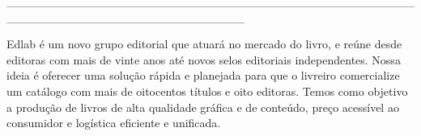 \blankpage

\pagestyle{indice}

\vspace*{.5cm}

{}

\vspace{.5cm}

{}


\hspace*{-2cm}\_\_\_\_\_\_\_\_\_\_\_\_\_\_\_\_\_\_\_\_\_\_\_\_\_\_\_\_\_\_\_\_\_\_\_\_\_\_\_\_\_\_\_\_\_\_\_\_\_\_\_\_\_\_\_\_\_\_\_\_\_\_\_\_\_\_\_\_\_\_\_\_\_\_\_\_

\vspace{1cm}

\hspace*{-.5cm}\parbox{150pt}{\raggedright Edlab é um novo grupo editorial que atuará no mercado do livro, e reúne desde editoras com mais de vinte anos até novos selos editoriais independentes. Nossa ideia é oferecer uma solução rápida e planejada para que o livreiro comercialize um catálogo com mais de oitocentos títulos e oito editoras. Temos como objetivo a produção de livros de alta qualidade gráfica e de conteúdo, preço acessível ao consumidor e logística eficiente e unificada.} %

